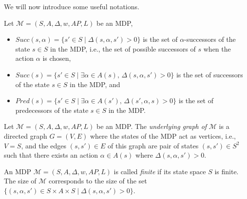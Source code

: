 We will now introduce some useful notations.

\begin{notation}
  Let $\mathcal{M}=(S, A, \Delta, w, AP, L)$ be an MDP,
  \begin{itemize}
    \item $Succ(s, \alpha) = \{ s' \in S \; | \; \Delta(s, \alpha, s') > 0 \}$
      is the set of $\alpha$-successors of the state $s \in S$ in the MDP, i.e., the set of possible successors of $s$ when the action $\alpha$ is chosen,
    \item $Succ(s) = \{ s' \in S \; | \; \exists \alpha \in A(s), \, \Delta(s, \alpha, s') > 0 \}$ is the set of successors of the state $s \in S$ in the MDP, and
    \item $Pred(s) = \{ s' \in S \; | \; \exists \alpha \in A(s'), \, \Delta(s', \alpha, s) > 0 \}$ is the set of predecessors of the state $s \in S$ in the MDP.
  \end{itemize}
\end{notation}

\begin{definition}
  Let $\mathcal{M}=(S, A, \Delta, w, AP, L)$ be an MDP. The \textit{underlying graph of} $\mathcal{M}$ is a directed graph $G = (V, E)$ where the states of the MDP act as vertices, i.e., $V = S$, and the edges $(s, s') \in E$ of this graph are pair of states $(s, s')\in S^2$ such that there exists an action $\alpha \in A(s)$ where $\Delta(s, \alpha, s')>0$.
\end{definition}

\begin{notation}
  An MDP $\mathcal{M}=(S, A, \Delta, w, AP, L)$ is called \textit{finite} if its state space $S$ is finite. The size of $\mathcal{M}$ corresponds to the size
  of the set $\{(s, \alpha, s') \in S \times A \times S \; | \; \Delta(s, \alpha, s') > 0 \}$.
\end{notation}

